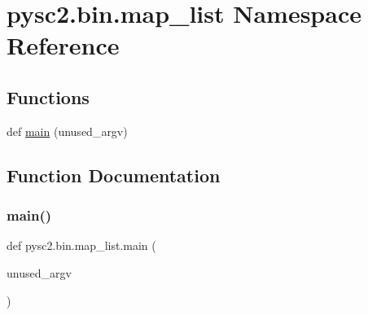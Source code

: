 \hypertarget{namespacepysc2_1_1bin_1_1map__list}{}\section{pysc2.\+bin.\+map\+\_\+list Namespace Reference}
\label{namespacepysc2_1_1bin_1_1map__list}
\subsection*{Functions}
\begin{DoxyCompactItemize}
\item 
def \mbox{\hyperlink{namespacepysc2_1_1bin_1_1map__list_a7fa0a5dc43a6b5ea8042028479f4edcd}{main}} (unused\+\_\+argv)
\end{DoxyCompactItemize}


\subsection{Function Documentation}
\mbox{\label{namespacepysc2_1_1bin_1_1map__list_a7fa0a5dc43a6b5ea8042028479f4edcd}} 
\subsubsection{\texorpdfstring{main()}{main()}}
{\footnotesize\ttfamily def pysc2.\+bin.\+map\+\_\+list.\+main (\begin{DoxyParamCaption}\item[{}]{unused\+\_\+argv }\end{DoxyParamCaption})}

